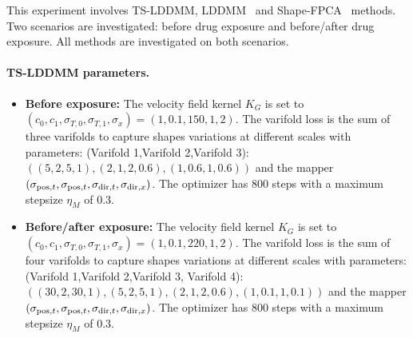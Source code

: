 This experiment involves TS-LDDMM, LDDMM~\cite{glaunes2008large} and Shape-FPCA~\cite{wu2024shape} methods. Two scenarios are investigated: before drug exposure and before/after drug exposure. All methods are investigated on both scenarios. 

\paragraph{TS-LDDMM parameters.}
\begin{itemize}
  \item \textbf{Before exposure:} The velocity field kernel $K_G$ is set to $ (c_0,c_1,\sigma_{T,0},\sigma_{T,1},\sigma_x) = (1,0.1,150,1,2)$. The varifold loss is the sum of three varifolds to capture shapes variations at different scales with parameters: (Varifold 1,Varifold 2,Varifold 3): $\left((5,2,5,1),(2,1,2,0.6),(1,0.6,1,0.6)\right)$ and the mapper $(\sigma_{\mathrm{pos},t}, \sigma_{\mathrm{pos},t}, \sigma_{\mathrm{dir},t}, \sigma_{\mathrm{dir},x})$. The optimizer has 800 steps with a maximum stepsize $\eta_M$ of 0.3.
  \item \textbf{Before/after exposure:} The velocity field kernel $K_G$ is set to $ (c_0,c_1,\sigma_{T,0},\sigma_{T,1},\sigma_x) = (1,0.1,220,1,2)$. The varifold loss is the sum of four varifolds to capture shapes variations at different scales with parameters: (Varifold 1,Varifold 2,Varifold 3, Varifold 4): $\left((30,2,30,1),(5,2,5,1),(2,1,2,0.6),(1,0.1,1,0.1)\right)$ and the mapper $(\sigma_{\mathrm{pos},t}, \sigma_{\mathrm{pos},t}, \sigma_{\mathrm{dir},t}, \sigma_{\mathrm{dir},x})$. The optimizer has 800 steps with a maximum stepsize $\eta_M$ of 0.3.
\end{itemize}

